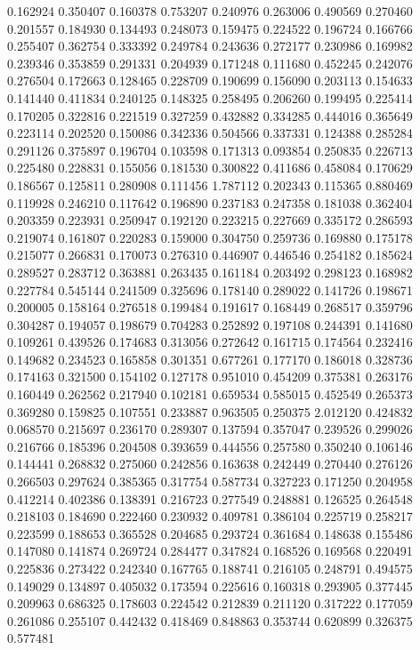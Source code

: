 0.162924
0.350407
0.160378
0.753207
0.240976
0.263006
0.490569
0.270460
0.201557
0.184930
0.134493
0.248073
0.159475
0.224522
0.196724
0.166766
0.255407
0.362754
0.333392
0.249784
0.243636
0.272177
0.230986
0.169982
0.239346
0.353859
0.291331
0.204939
0.171248
0.111680
0.452245
0.242076
0.276504
0.172663
0.128465
0.228709
0.190699
0.156090
0.203113
0.154633
0.141440
0.411834
0.240125
0.148325
0.258495
0.206260
0.199495
0.225414
0.170205
0.322816
0.221519
0.327259
0.432882
0.334285
0.444016
0.365649
0.223114
0.202520
0.150086
0.342336
0.504566
0.337331
0.124388
0.285284
0.291126
0.375897
0.196704
0.103598
0.171313
0.093854
0.250835
0.226713
0.225480
0.228831
0.155056
0.181530
0.300822
0.411686
0.458084
0.170629
0.186567
0.125811
0.280908
0.111456
1.787112
0.202343
0.115365
0.880469
0.119928
0.246210
0.117642
0.196890
0.237183
0.247358
0.181038
0.362404
0.203359
0.223931
0.250947
0.192120
0.223215
0.227669
0.335172
0.286593
0.219074
0.161807
0.220283
0.159000
0.304750
0.259736
0.169880
0.175178
0.215077
0.266831
0.170073
0.276310
0.446907
0.446546
0.254182
0.185624
0.289527
0.283712
0.363881
0.263435
0.161184
0.203492
0.298123
0.168982
0.227784
0.545144
0.241509
0.325696
0.178140
0.289022
0.141726
0.198671
0.200005
0.158164
0.276518
0.199484
0.191617
0.168449
0.268517
0.359796
0.304287
0.194057
0.198679
0.704283
0.252892
0.197108
0.244391
0.141680
0.109261
0.439526
0.174683
0.313056
0.272642
0.161715
0.174564
0.232416
0.149682
0.234523
0.165858
0.301351
0.677261
0.177170
0.186018
0.328736
0.174163
0.321500
0.154102
0.127178
0.951010
0.454209
0.375381
0.263176
0.160449
0.262562
0.217940
0.102181
0.659534
0.585015
0.452549
0.265373
0.369280
0.159825
0.107551
0.233887
0.963505
0.250375
2.012120
0.424832
0.068570
0.215697
0.236170
0.289307
0.137594
0.357047
0.239526
0.299026
0.216766
0.185396
0.204508
0.393659
0.444556
0.257580
0.350240
0.106146
0.144441
0.268832
0.275060
0.242856
0.163638
0.242449
0.270440
0.276126
0.266503
0.297624
0.385365
0.317754
0.587734
0.327223
0.171250
0.204958
0.412214
0.402386
0.138391
0.216723
0.277549
0.248881
0.126525
0.264548
0.218103
0.184690
0.222460
0.230932
0.409781
0.386104
0.225719
0.258217
0.223599
0.188653
0.365528
0.204685
0.293724
0.361684
0.148638
0.155486
0.147080
0.141874
0.269724
0.284477
0.347824
0.168526
0.169568
0.220491
0.225836
0.273422
0.242340
0.167765
0.188741
0.216105
0.248791
0.494575
0.149029
0.134897
0.405032
0.173594
0.225616
0.160318
0.293905
0.377445
0.209963
0.686325
0.178603
0.224542
0.212839
0.211120
0.317222
0.177059
0.261086
0.255107
0.442432
0.418469
0.848863
0.353744
0.620899
0.326375
0.577481
